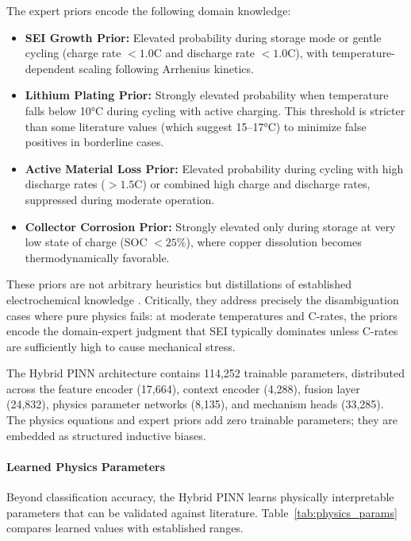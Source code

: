 \documentclass[5p,times,authoryear]{elsarticle}
\begin{document}
The expert priors encode the following domain knowledge:
\begin{itemize}
    \item \textbf{SEI Growth Prior:} Elevated probability during storage mode or gentle cycling (charge rate $< 1.0$C and discharge rate $< 1.0$C), with temperature-dependent scaling following Arrhenius kinetics.
    \item \textbf{Lithium Plating Prior:} Strongly elevated probability when temperature falls below 10°C during cycling with active charging. This threshold is stricter than some literature values (which suggest 15--17°C) to minimize false positives in borderline cases.
    \item \textbf{Active Material Loss Prior:} Elevated probability during cycling with high discharge rates ($> 1.5$C) or combined high charge and discharge rates, suppressed during moderate operation.
    \item \textbf{Collector Corrosion Prior:} Strongly elevated only during storage at very low state of charge (SOC $< 25\%$), where copper dissolution becomes thermodynamically favorable.
\end{itemize}

These priors are not arbitrary heuristics but distillations of established electrochemical knowledge \citep{vetter2005ageing, waldmann2014temperature, zhang2020degradation}. Critically, they address precisely the disambiguation cases where pure physics fails: at moderate temperatures and C-rates, the priors encode the domain-expert judgment that SEI typically dominates unless C-rates are sufficiently high to cause mechanical stress.



The Hybrid PINN architecture contains 114,252 trainable parameters, distributed across the feature encoder (17,664), context encoder (4,288), fusion layer (24,832), physics parameter networks (8,135), and mechanism heads (33,285). The physics equations and expert priors add zero trainable parameters; they are embedded as structured inductive biases.

\paragraph{Learned Physics Parameters}

Beyond classification accuracy, the Hybrid PINN learns physically interpretable parameters that can be validated against literature. Table~\ref{tab:physics_params} compares learned values with established ranges.
\end{document}
